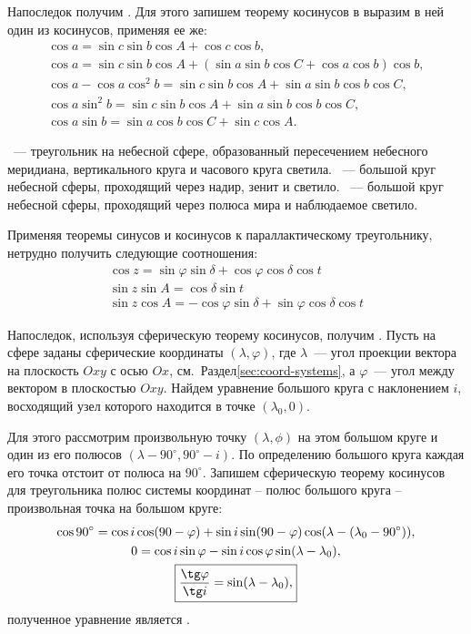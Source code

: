 Напоследок получим . Для этого запишем теорему косинусов в выразим в ней один из косинусов, применяя ее же:
\begin{gather}
	\cos a = \sin c \sin b \cos A + \cos c \cos b,\nonumber\\
	\cos a = \sin c \sin b \cos A + \left( \sin a \sin b \cos C + \cos a \cos b \right)\cos b,\nonumber\\
	\cos a - \cos a \cos^2 b = \sin c \sin b \cos A + \sin a \sin b \cos b \cos C,\nonumber\\
	\cos a \sin^2 b = \sin c \sin b \cos A + \sin a \sin b \cos b \cos C,\nonumber\\
	\cos a \sin b = \sin a \cos b \cos C + \sin c \cos A.
\end{gather}

~--- треугольник на небесной  сфере, образованный пересечением небесного меридиана, вертикального круга и часового круга светила. ~--- большой круг небесной сферы, проходящий через надир, зенит и светило. ~--- большой круг небесной сферы, проходящий через полюса мира и наблюдаемое светило.

Применяя теоремы синусов и косинусов к параллактическому треугольнику, нетрудно получить следующие соотношения:
\begin{gather}
	\cos z=\sin\varphi\sin\delta+\cos\varphi\cos\delta\cos t\\
	\sin z\sin A=\cos\delta\sin t\\
	\sin z\cos A=-\cos\varphi\sin\delta+\sin\varphi\cos\delta\cos t
\end{gather}

Напоследок, используя сферическую теорему косинусов, получим . Пусть на сфере заданы сферические координаты $(\lambda, \varphi)$, где $\lambda$~--- угол проекции вектора на плоскость $Oxy$ с осью $Ox$, см.~Раздел\;\ref{sec:coord-systems}, а $\varphi$~--- угол между вектором в плоскостью $Oxy$. Найдем уравнение большого круга с наклонением $i$, восходящий узел которого находится в точке $(\lambda_0, 0)$. 

Для этого рассмотрим произвольную точку $(\lambda, \phi)$ на этом большом круге и один из его полюсов $(\lambda - 90^\circ, 90^\circ - i)$. По определению большого круга каждая его точка отстоит от полюса на $90^\circ$. Запишем сферическую теорему косинусов для треугольника полюс системы координат -- полюс большого круга -- произвольная точка на большом круге:
\begin{gather}
    \cos 90^\circ = \cos i \cos (90 - \varphi) + \sin i \sin (90 - \varphi) \cos (\lambda - (\lambda_0 - 90^\circ)),\nonumber \\
    0 = \cos i \sin \varphi - \sin i \cos \varphi \sin (\lambda - \lambda_0),\nonumber\\
    \boxed{\frac{\tg \varphi}{\tg i} = \sin (\lambda - \lambda_0),}
    \label{eq:great-circle-eq}
\end{gather}
полученное уравнение является .